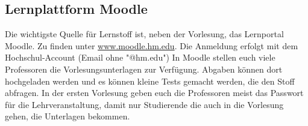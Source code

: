\subsection{Lernplattform Moodle}
Die wichtigste Quelle für Lernstoff ist, neben der 
Vorlesung, das Lernportal Moodle. Zu finden  unter 
\url{www.moodle.hm.edu}. Die Anmeldung erfolgt mit dem Hochschul-Account (Email ohne "@hm.edu")\doublebreak 
In Moodle stellen euch viele Professoren die Vorlesungsunterlagen 
zur Verfügung. Abgaben können dort hochgeladen werden und es 
können kleine Tests gemacht werden, die den Stoff abfragen. In der 
ersten Vorlesung geben euch die Professoren meist das Passwort für 
die Lehrveranstaltung, damit nur Studierende die auch in die Vorlesung 
gehen, die Unterlagen bekommen. 